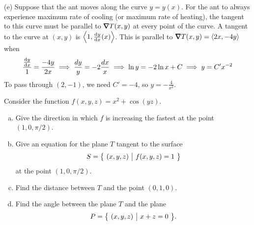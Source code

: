 \begin{solution}
(e) Suppose that the ant moves along the curve $y=y(x)$. For the ant to always
experience maximum rate of cooling (or maximum rate of heating), 
the tangent to this curve must be parallel to $\vnabla T(x,y)$ at every point of the curve. A tangent to the curve at $(x,y)$ is $\llt 1,\diff{y}{x}(x)\rgt$.
This is parallel to $\vnabla T(x,y)=\llt 2x,-4y\rgt$ when
\begin{align*}
\frac{\diff{y}{x}}{1}=\frac{-4y}{2x}
\implies \frac{dy}{y}=-2\frac{dx}{x}
\implies \ln y=-2\ln x+C
\implies y=C'x^{-2}
\end{align*}
To pass through $(2,-1)$, we need $C'=-4$, so $y=-\frac{4}{x^2}$.



\end{solution}



\begin{question}[M200 2008A] %
Consider the function $f(x,y,z) = x^2 + \cos(yz)$.

\begin{enumerate}[(a)]
\item
Give the direction in which $f$ is increasing the fastest at the point 
$(1, 0, \pi/2)$.

\item
Give an equation for the plane $T$ tangent to the surface 
\begin{equation*}
S = \big\{ \ (x,y,z)\ \big|\ f(x,y,z) = 1\ \big\}
\end{equation*}
at the point $(1, 0, \pi/2)$.

\item
Find the distance between $T$ and the point $(0, 1, 0)$.

\item
Find the angle between the plane $T$ and the plane
\begin{equation*}
P = \big\{ \ (x,y,z)\ \big|\ x + z = 0\ \big\}.
\end{equation*}

\end{enumerate}
\end{question}

